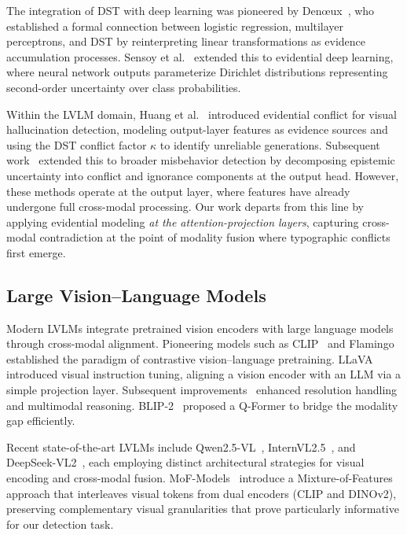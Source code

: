 \documentclass[preprint,12pt]{elsarticle}
\begin{document}
The integration of DST with deep learning was pioneered by Den{\oe}ux~\cite{denoeux2019logistic}, who established a formal connection between logistic regression, multilayer perceptrons, and DST by reinterpreting linear transformations as evidence accumulation processes. Sensoy et al.~\cite{sensoy2018evidential} extended this to evidential deep learning, where neural network outputs parameterize Dirichlet distributions representing second-order uncertainty over class probabilities.

Within the LVLM domain, Huang et al.~\cite{huang2025visual} introduced evidential conflict for visual hallucination detection, modeling output-layer features as evidence sources and using the DST conflict factor $\kappa$ to identify unreliable generations. Subsequent work~\cite{huang2026detecting} extended this to broader misbehavior detection by decomposing epistemic uncertainty into conflict and ignorance components at the output head. However, these methods operate at the output layer, where features have already undergone full cross-modal processing. Our work departs from this line by applying evidential modeling \emph{at the attention-projection layers}, capturing cross-modal contradiction at the point of modality fusion where typographic conflicts first emerge.

\subsection{Large Vision--Language Models}

Modern LVLMs integrate pretrained vision encoders with large language models through cross-modal alignment. Pioneering models such as CLIP~\cite{radford2021learning} and Flamingo~\cite{alayrac2022flamingo} established the paradigm of contrastive vision--language pretraining. LLaVA~\cite{liu2023visual} introduced visual instruction tuning, aligning a vision encoder with an LLM via a simple projection layer. Subsequent improvements~\cite{liu2024improved,li2024llava} enhanced resolution handling and multimodal reasoning. BLIP-2~\cite{li2023blip} proposed a Q-Former to bridge the modality gap efficiently.

Recent state-of-the-art LVLMs include Qwen2.5-VL~\cite{wu2025qwen}, InternVL2.5~\cite{chen2024expanding}, and DeepSeek-VL2~\cite{wu2024deepseek}, each employing distinct architectural strategies for visual encoding and cross-modal fusion. MoF-Models~\cite{tong2024eyes} introduce a Mixture-of-Features approach that interleaves visual tokens from dual encoders (CLIP and DINOv2), preserving complementary visual granularities that prove particularly informative for our detection task.
\end{document}
